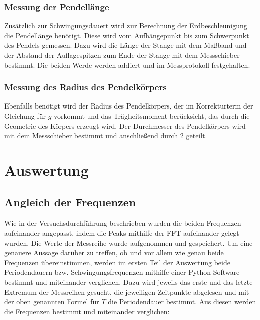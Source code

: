 \documentclass[a4paper, 11pt]{article}
\begin{document}
\subsubsection{Messung der Pendellänge}
Zusätzlich zur Schwingungsdauert wird zur Berechnung der Erdbeschleunigung die Pendellänge benötigt. Diese wird vom Aufhängepunkt bis zum Schwerpunkt des Pendels gemessen. Dazu wird die Länge der Stange mit dem Maßband und der Abstand der Auflagespitzen zum Ende der Stange mit dem Messschieber bestimmt. Die beiden Werde werden addiert und im Messprotokoll festgehalten. \\

\subsubsection{Messung des Radius des Pendelkörpers}
Ebenfalls benötigt wird der Radius des Pendelkörpers, der im Korrekturterm der Gleichung für $g$ vorkommt und das Trägheitsmoment berücksicht, das durch die Geometrie des Körpers erzeugt wird. Der Durchmesser des Pendelkörpers wird mit dem Messschieber bestimmt und anschließend durch 2 geteilt. \\

\section{Auswertung}
\subsection{Angleich der Frequenzen}
Wie in der Versuchsdurchführung beschrieben wurden die beiden Frequenzen aufeinander angepasst, indem die Peaks mithilfe der FFT aufeinander gelegt wurden. Die Werte der Messreihe wurde aufgenommen und gespeichert. Um eine genauere Aussage darüber zu treffen, ob und vor allem wie genau beide Frequenzen übereinstimmen, werden im ersten Teil der Auswertung beide Periodendauern bzw. Schwingungsfrequenzen mithilfe einer Python-Software bestimmt und miteinander verglichen. Dazu wird jeweils das erste und das letzte Extremum der Messreihen gesucht, die jeweiligen Zeitpunkte abgelesen und mit der oben genannten Formel für $T$ die Periodendauer bestimmt. Aus diesen werden die Frequenzen bestimmt und miteinander verglichen:
\\

\end{document}
